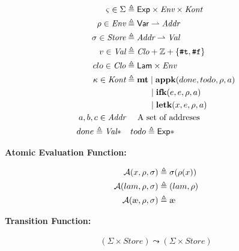 \documentclass[12pt,draft]{article}
\begin{document}
\begin{align*}
\varsigma \in \Sigma &\triangleq \textsf{Exp} \times \textit{Env} \times \textit{Kont} \\
\rho \in \textit{Env} &\triangleq \textsf{Var} \rightharpoonup \textit{Addr} \\
\sigma \in \textit{Store} &\triangleq \textit{Addr} \rightharpoonup \textit{Val} \\
v \in \textit{Val} &\triangleq \textit{Clo} + \mathbb{Z} + \{\texttt{\#t}, \texttt{\#f}\} \\
clo \in \textit{Clo} &\triangleq \textsf{Lam} \times \textit{Env} \\
\kappa \in \textit{Kont} &\triangleq \textbf{mt} \;|\; \textbf{appk}(done, todo, \rho, a) \\
					   &	\;\;\;\;\;\;\;\;\;\; \;|\; \textbf{ifk}(e, e, \rho, a) \\
					   &	\;\;\;\;\;\;\;\;\;\; \;|\; \textbf{letk}(x, e, \rho, a) \\
a,b,c \in \textit{Addr} &\;\;\;\;\; \text{A set of addreses} \\
done \triangleq \textit{Val}* \;\;&\;\; todo \triangleq \textsf{Exp}*
\end{align*}
\vspace{-10mm}
\begin{center}
\textbf{Atomic Evaluation Function:}
\end{center}
\vspace{-7mm}
\begin{align*}
\mathcal{A}(x, \rho, \sigma) &\triangleq \sigma(\rho(x)) \\
\mathcal{A}(lam, \rho, \sigma) &\triangleq (lam , \rho) \\
\mathcal{A}(\mae, \rho, \sigma) &\triangleq \mae
\end{align*}
\vspace{-10mm}
\begin{center}
\textbf{Transition Function:}
\end{center}
\vspace{-7mm}
\begin{align*}
(\Sigma \times \textit{Store}) \leadsto (\Sigma \times \textit{Store})
\end{align*}

\newpage



\end{document}
